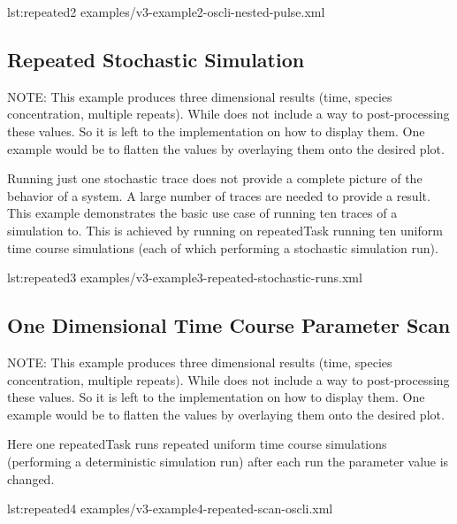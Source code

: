 {lst:repeated2}
{examples/v3-example2-oscli-nested-pulse.xml}

\subsection{Repeated Stochastic Simulation}
NOTE: This example produces three dimensional results (time, species concentration, multiple repeats). While \LoneVtwo does not include a way to post-processing these values. So it is left to the implementation on how to display them. One example would be to flatten the values by overlaying them onto the desired plot. 

Running just one stochastic trace does not provide a complete picture of the behavior of a system. A large number of traces are needed to provide a result. This example demonstrates the basic use case of running ten traces of a simulation to. This is achieved by running on repeatedTask running ten uniform time course simulations (each of which performing a stochastic simulation run). 


{lst:repeated3}
{examples/v3-example3-repeated-stochastic-runs.xml}

\subsection{One Dimensional Time Course Parameter Scan}
NOTE: This example produces three dimensional results (time, species concentration, multiple repeats). While \LoneVtwo does not include a way to post-processing these values. So it is left to the implementation on how to display them. One example would be to flatten the values by overlaying them onto the desired plot. 

Here one repeatedTask  runs repeated uniform time course simulations (performing a deterministic simulation run) after each run the parameter value is changed.


{lst:repeated4}
{examples/v3-example4-repeated-scan-oscli.xml}

